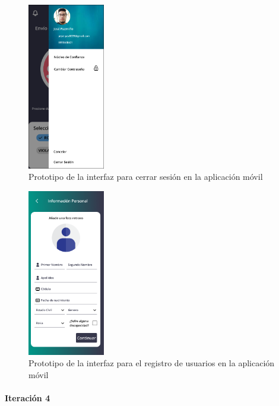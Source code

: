 \begin{figure}[H]
      \centering
      \includegraphics[width=0.3\textwidth]{chapters/III-resultados-y-discusion/resources/images/prototipo-menu-mobile.png}
      \caption{Prototipo de la interfaz para cerrar sesión en la aplicación móvil}
      \label{fig:prototipo-menu-mobile}
\end{figure}

\begin{figure}[H]
      \centering
      \includegraphics[width=0.3\textwidth]{chapters/III-resultados-y-discusion/resources/images/prototipo-registro-mobile.png}
      \caption{Prototipo de la interfaz para el registro de usuarios en la aplicación móvil}
      \label{fig:prototipo-registro-mobile}
\end{figure}

\paragraph{Iteración 4}

